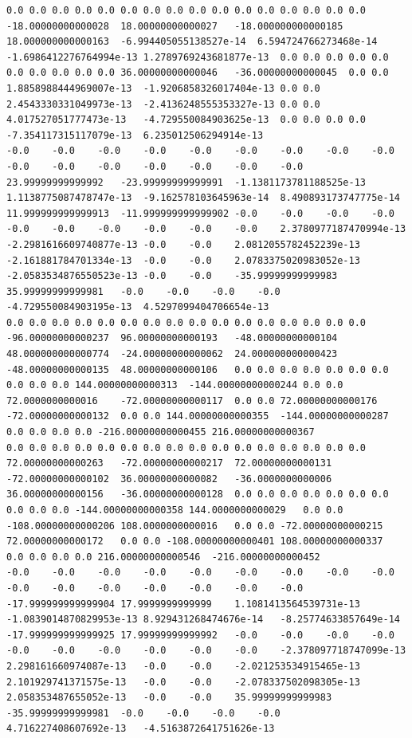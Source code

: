 \documentclass[12pt]{report} %
\begin{document}
\begin{landscape}
\begin{lstlisting}[numbers=none, basicstyle=\ttfamily\tiny, captionpos=b, caption={Matriz de coeficientes $W = G^{-1}$ ($54\times54$) calculada con Julia, sin redondear.}, label=cod:W-julia]
0.0	0.0	0.0	0.0	0.0	0.0	0.0	0.0	0.0	0.0	0.0	0.0	0.0	0.0	0.0	0.0	-18.00000000000028	18.00000000000027	-18.000000000000185	18.000000000000163	-6.994405055138527e-14	6.594724766273468e-14	-1.6986412276764994e-13	1.2789769243681877e-13	0.0	0.0	0.0	0.0	0.0	0.0	0.0	0.0	0.0	0.0	36.00000000000046	-36.00000000000045	0.0	0.0	1.8858988444969007e-13	-1.9206858326017404e-13	0.0	0.0	2.4543330331049973e-13	-2.4136248555353327e-13	0.0	0.0	4.017527051777473e-13	-4.729550084903625e-13	0.0	0.0	0.0	0.0	-7.354117315117079e-13	6.235012506294914e-13
-0.0	-0.0	-0.0	-0.0	-0.0	-0.0	-0.0	-0.0	-0.0	-0.0	-0.0	-0.0	-0.0	-0.0	-0.0	-0.0	23.99999999999992	-23.99999999999991	-1.1381173781188525e-13	1.1138775087478747e-13	-9.162578103645963e-14	8.490893173747775e-14	11.999999999999913	-11.999999999999902	-0.0	-0.0	-0.0	-0.0	-0.0	-0.0	-0.0	-0.0	-0.0	-0.0	2.3780977187470994e-13	-2.2981616609740877e-13	-0.0	-0.0	2.0812055782452239e-13	-2.161881784701334e-13	-0.0	-0.0	2.0783375020983052e-13	-2.0583534876550523e-13	-0.0	-0.0	-35.99999999999983	35.99999999999981	-0.0	-0.0	-0.0	-0.0	-4.729550084903195e-13	4.5297099404706654e-13
0.0	0.0	0.0	0.0	0.0	0.0	0.0	0.0	0.0	0.0	0.0	0.0	0.0	0.0	0.0	0.0	-96.00000000000237	96.00000000000193	-48.00000000000104	48.000000000000774	-24.00000000000062	24.000000000000423	-48.00000000000135	48.00000000000106	0.0	0.0	0.0	0.0	0.0	0.0	0.0	0.0	0.0	0.0	144.00000000000313	-144.00000000000244	0.0	0.0	72.0000000000016	-72.00000000000117	0.0	0.0	72.00000000000176	-72.00000000000132	0.0	0.0	144.00000000000355	-144.00000000000287	0.0	0.0	0.0	0.0	-216.00000000000455	216.00000000000367
0.0	0.0	0.0	0.0	0.0	0.0	0.0	0.0	0.0	0.0	0.0	0.0	0.0	0.0	0.0	0.0	72.00000000000263	-72.00000000000217	72.00000000000131	-72.00000000000102	36.00000000000082	-36.0000000000006	36.00000000000156	-36.00000000000128	0.0	0.0	0.0	0.0	0.0	0.0	0.0	0.0	0.0	0.0	-144.00000000000358	144.0000000000029	0.0	0.0	-108.00000000000206	108.0000000000016	0.0	0.0	-72.00000000000215	72.00000000000172	0.0	0.0	-108.00000000000401	108.00000000000337	0.0	0.0	0.0	0.0	216.00000000000546	-216.00000000000452
-0.0	-0.0	-0.0	-0.0	-0.0	-0.0	-0.0	-0.0	-0.0	-0.0	-0.0	-0.0	-0.0	-0.0	-0.0	-0.0	-17.999999999999904	17.9999999999999	1.1081413564539731e-13	-1.0839014870829953e-13	8.929431268474676e-14	-8.25774633857649e-14	-17.999999999999925	17.99999999999992	-0.0	-0.0	-0.0	-0.0	-0.0	-0.0	-0.0	-0.0	-0.0	-0.0	-2.378097718747099e-13	2.298161660974087e-13	-0.0	-0.0	-2.021253534915465e-13	2.101929741371575e-13	-0.0	-0.0	-2.078337502098305e-13	2.058353487655052e-13	-0.0	-0.0	35.99999999999983	-35.99999999999981	-0.0	-0.0	-0.0	-0.0	4.716227408607692e-13	-4.5163872641751626e-13

\end{lstlisting}
\end{landscape}
\end{document}

